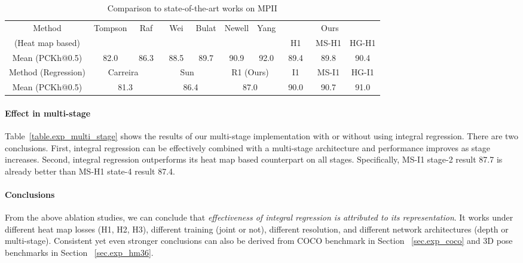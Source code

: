 \documentclass[runningheads]{llncs}
\begin{document}
\begin{table}[t]
\caption{Comparison to state-of-the-art works on MPII}
\centering
\begin{tabular}{|c|c|c|c|c|c|c|c|c|c|}
\hline
Method &Tompson  & ~Raf~  & ~Wei~ &Bulat &Newell & Yang &\multicolumn{3}{|c|}{Ours}\\
\cline{8-10}
(Heat map based)&\cite{tompson2015efficient}&\cite{rafi2016efficient}&\cite{wei2016convolutional}&\cite{bulat2016human} &\cite{newell2016stacked} &\cite{yang2017learning}&H1&MS-H1& HG-H1\\
\hline
Mean (PCKh@0.5)&82.0&86.3&88.5&89.7&90.9&92.0& ~89.4~ & 89.8 & 90.4\\
\hline \hline
Method (Regression)&\multicolumn{2}{|c|}{Carreira~\cite{carreira2016human}}&\multicolumn{2}{|c|}{Sun ~\cite{sun2017compositional}}&
\multicolumn{2}{|c|}{R1 (Ours)} &I1&MS-I1& HG-I1 \\
\hline
Mean (PCKh@0.5) &\multicolumn{2}{|c|}{81.3}&\multicolumn{2}{|c|}{86.4}& \multicolumn{2}{|c|}{87.0}&90.0 & 90.7 & 91.0\\
\hline
\end{tabular}
\label{table.mpii_benchmark}
\end{table}

\paragraph{\textbf{Effect in multi-stage}}
Table~\ref{table.exp_multi_stage} shows the results of our multi-stage implementation with or without using integral regression. There are two conclusions. First, integral regression can be effectively combined with a multi-stage architecture and performance improves as stage increases. Second, integral regression outperforms its heat map based counterpart on all stages. Specifically, MS-I1 stage-2 result 87.7 is already better than MS-H1 state-4 result 87.4.

\paragraph{\textbf{Conclusions}} From the above ablation studies, we can conclude that \emph{effectiveness of integral regression is attributed to its representation}. It works under different heat map losses (H1, H2, H3), different training (joint or not), different resolution, and different network architectures (depth or multi-stage). Consistent yet even stronger conclusions can also be derived from COCO benchmark in Section ~\ref{sec.exp_coco} and 3D pose benchmarks in Section ~\ref{sec.exp_hm36}.
\end{document}
